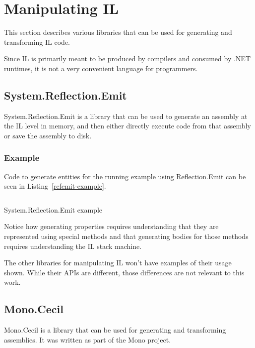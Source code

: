 \section{Manipulating \acs{IL}}

This section describes various libraries that can be used for generating and transforming \ac{IL} code.

Since \ac{IL} is primarily meant to be produced by compilers and consumed by .NET runtimes, it is not a very convenient language for programmers.

\subsection{System.Reflection.Emit}

System.Reflection.Emit \cite{refemit} is a library that can be used to generate an assembly at the \ac{IL} level in memory, and then either directly execute code from that assembly or save the assembly to disk.

\subsubsection{Example}

Code to generate entities for the running example using Reflection.Emit can be seen in Listing~\ref{refemit-example}.

\begin{listing}
\inputminted[firstline=12,lastline=64]{csharp}{samples/ReflectionEmit/Program.cs}
\caption{System.Reflection.Emit example}
\label{refemit-example}
\end{listing}

Notice how generating properties requires understanding that they are represented using special methods and that generating bodies for those methods requires understanding the \ac{IL} stack machine.

\medskip

The other libraries for manipulating \ac{IL} won't have examples of their usage shown. While their \acp{API} are different, those differences are not relevant to this work.

\subsection{Mono.Cecil}

Mono.Cecil \cite{cecil} is a library that can be used for generating and transforming assemblies. It was written as part of the Mono project.

